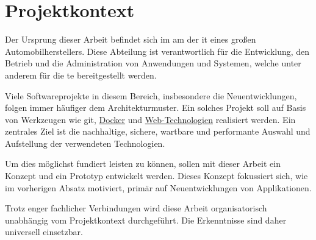 \section{Projektkontext}
\label{sec:01-02_project-context}

Der Ursprung dieser Arbeit befindet sich im \Gls{am} der \Gls{it} eines großen Automobilherstellers. Diese Abteilung ist verantwortlich für die Entwicklung, den Betrieb und die Administration von Anwendungen und Systemen, welche unter anderem für die \Gls{te} bereitgestellt werden.

Viele Softwareprojekte in diesem Bereich, insbesondere die Neuentwicklungen, folgen immer häufiger dem  Architekturmuster. Ein solches Projekt soll auf Basis von Werkzeugen wie \Gls{git}, \hyperref[sec:02-03_containerization]{Docker} und \hyperref[sec:02-01_web-development]{Web-Technologien} realisiert werden. Ein zentrales Ziel ist die nachhaltige, sichere, wartbare und performante Auswahl und Aufstellung der verwendeten Technologien.

Um dies möglichst fundiert leisten zu können, sollen mit dieser Arbeit ein Konzept und ein Prototyp entwickelt werden. Dieses Konzept fokussiert sich, wie im vorherigen Absatz motiviert, primär auf Neuentwicklungen von Applikationen.

Trotz enger fachlicher Verbindungen wird diese Arbeit organisatorisch unabhängig vom Projektkontext durchgeführt. Die Erkenntnisse sind daher universell einsetzbar.
